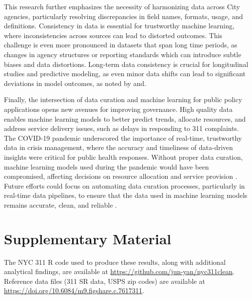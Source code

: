 \documentclass[linenumber]{jdsart}
\begin{document}
This research further emphasizes the necessity of harmonizing data
across City agencies, particularly resolving discrepancies in field
names, formats, usage, and definitions. Consistency in data is essential for
trustworthy machine learning, where inconsistencies across sources can
lead to distorted outcomes. This challenge is even more pronounced in
datasets that span long time periods, as changes in agency structures
or reporting standards which can introduce subtle biases and data 
distortions. Long-term data consistency is crucial for 
longitudinal studies and predictive modeling, as even minor 
data shifts can lead to significant deviations in model outcomes, 
as noted by \citet{rahm2000data} and\citet{borgman2012conundrum}.


Finally, the intersection of data curation and machine learning for
public policy applications opens new avenues for improving governance.
High quality data enables machine learning models to better predict
trends, allocate resources, and address service delivery issues, such
as delays in responding to 311 complaints. The COVID-19 pandemic
underscored the importance of real-time, trustworthy data in crisis
management, where the accuracy and timeliness of data-driven insights
were critical for public health responses. Without proper data
curation, machine learning models used during the pandemic would have
been compromised, affecting decisions on resource allocation and
service provision \citep{worby2020face, khemasuwan2021applications}.
Future efforts could focus on automating data curation processes,
particularly in real-time data pipelines, to ensure that the data used
in machine learning models remains accurate, clean, and reliable
\citep{chu2016data, hurbean2021open}.


\section*{Supplementary Material}
The NYC 311 R code used to produce these results, along 
with additional analytical findings, are available 
at \url{https://github.com/jun-yan/nyc311clean}. Reference 
data files (311 SR data, USPS zip codes) are available 
at \url{https://doi.org/10.6084/m9.figshare.c.7617311}.




\end{document}
